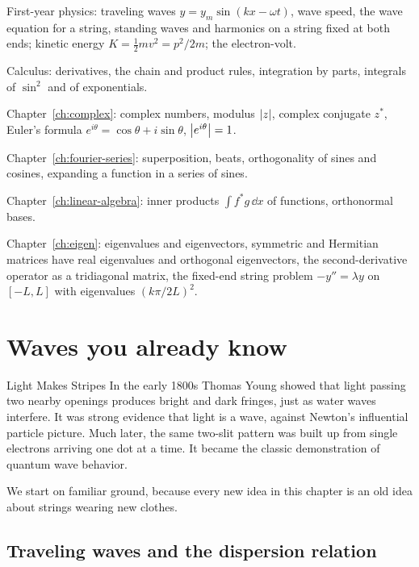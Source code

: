 \begin{prerequisites}
\item First-year physics: traveling waves $y=y_m\sin(kx-\omega t)$, wave speed, the wave equation for a string, standing waves and harmonics on a string fixed at both ends; kinetic energy $K=\tfrac12mv^2=p^2/2m$; the electron-volt.
\item Calculus: derivatives, the chain and product rules, integration by parts, integrals of $\sin^2$ and of exponentials.
\item Chapter~\ref{ch:complex}: complex numbers, modulus $\left\lvert z\right\rvert$, complex conjugate $z^*$, Euler's formula $e^{i\theta}=\cos\theta+i\sin\theta$, $\left\lvert e^{i\theta}\right\rvert=1$.
\item Chapter~\ref{ch:fourier-series}: superposition, beats, orthogonality of sines and cosines, expanding a function in a series of sines.
\item Chapter~\ref{ch:linear-algebra}: inner products $\int f^*g\,\dd x$ of functions, orthonormal bases.
\item Chapter~\ref{ch:eigen}: eigenvalues and eigenvectors, symmetric and Hermitian matrices have real eigenvalues and orthogonal eigenvectors, the second-derivative operator as a tridiagonal matrix, the fixed-end string problem $-y''=\lambda y$ on $[-L,L]$ with eigenvalues $(k\pi/2L)^2$.
\end{prerequisites}

\section{Waves you already know}\label{sec:schrodinger-strings}
\begin{didyouknow}{Light Makes Stripes}
In the early 1800s Thomas Young showed that light passing two nearby openings produces bright and dark fringes, just as water waves interfere. It was strong evidence that light is a wave, against Newton's influential particle picture. Much later, the same two-slit pattern was built up from single electrons arriving one dot at a time. It became the classic demonstration of quantum wave behavior.
\end{didyouknow}

We start on familiar ground, because every new idea in this chapter is an old idea about strings wearing new clothes.

\subsection{Traveling waves and the dispersion relation}

